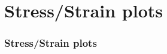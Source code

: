 \section[Stress/Strain]{Stress/Strain plots}

\graphicspath{{Chapter5/Figs/Vector/}{Chapter4/Figs/Vector/}}

\begin{frame}
  \frametitle{Stress/Strain plots}
  \framesubtitle{}
  \label{fr6:terr_sat_ext}

\end{frame}
\note{}
